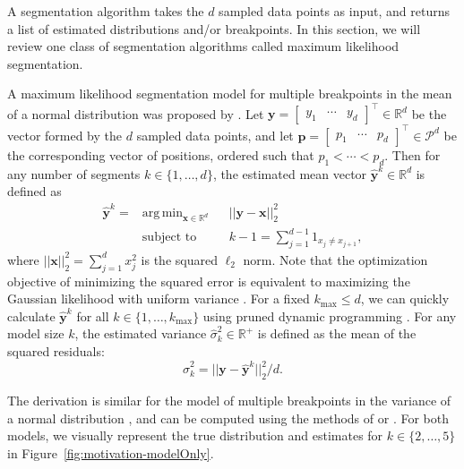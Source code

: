 \documentclass{jsfds} %
\DeclareMathOperator*{\argmin}{arg\,min}
\newcommand{\RR}{\mathbb{R}}
\begin{document}
A segmentation algorithm takes the $d$ sampled data points as input,
and returns a list of estimated distributions and/or breakpoints. In
this section, we will review one class of segmentation algorithms
called maximum likelihood segmentation.

A maximum likelihood segmentation model for multiple breakpoints in
the mean of a normal distribution was proposed by
\citet{statistical-approach}. Let $\mathbf y = \left[
  \begin{array}{ccc}
    y_1 & \cdots & y_d
  \end{array}
\right]^\intercal \in \RR^d$ be the vector formed by the $d$
sampled data points, and let  $\mathbf p = \left[
  \begin{array}{ccc}
    p_1 & \cdots & p_d
  \end{array}
\right]^\intercal \in \mathcal P^d$ be the corresponding vector of
positions, ordered such that $p_1 < \cdots < p_d$. Then for any number
of segments $k\in\{1, \dots, d\}$, the estimated mean vector $\mathbf{\hat
  y}^k\in\RR^d$ is defined as
\begin{equation}
\label{eq:yhat^k}
\begin{aligned}
\mathbf{\hat  y}^k = &\argmin_{\mathbf x \in \RR^d} &&  ||\mathbf y - \mathbf x||^2_2
\\
&\text{subject to} && k-1=\sum_{j=1}^{d-1} 1_{x_j\neq x_{j+1}},
\end{aligned}
\end{equation}
where $||\mathbf x||^2_2=\sum_{j=1}^d x_j^2$ is the squared $\ell_2$
norm. Note that the optimization objective of minimizing the squared
error is equivalent to maximizing the Gaussian likelihood with uniform
variance \citep{statistical-approach}. For a fixed $k_{\text{max}}\leq
d$, we can quickly calculate $\mathbf{\hat y}^k$ for all
$k\in\{1,\dots,k_{\text{max}}\}$ using pruned dynamic programming
\citep{pruned-dp}. For any model size $k$, the estimated variance
$\hat \sigma^2_k\in\RR^+$ is defined as the mean of the squared
residuals:
\begin{equation}
  \label{eq:sigmahat}
  \hat \sigma_k^2 = ||\mathbf y - \mathbf{\hat y}^k||^2_2/d.
\end{equation}

The derivation is similar for the model of multiple breakpoints in the
variance of a normal distribution \citep{lavielle2005}, and can be
computed using the methods of \citet{pelt} or \citet{segmentor}. For
both models, we visually represent the true distribution and estimates
for $k\in\{2, \dots, 5\}$ in Figure~\ref{fig:motivation-modelOnly}.
\end{document}
